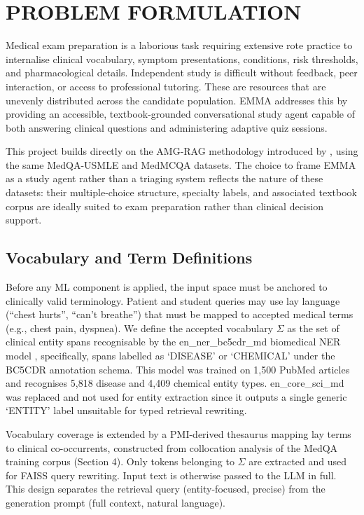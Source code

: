 \section{PROBLEM FORMULATION}
Medical exam preparation is a laborious task requiring extensive rote practice to internalise clinical vocabulary, symptom presentations, conditions, risk thresholds, and pharmacological details. Independent study is difficult without feedback, peer interaction, or access to professional tutoring. These are resources that are unevenly distributed across the candidate population. EMMA addresses this by providing an accessible, textbook-grounded conversational study agent capable of both answering clinical questions and administering adaptive quiz sessions.

This project builds directly on the AMG-RAG methodology introduced by \cite{rezaei2025}, using the same MedQA-USMLE and MedMCQA datasets. The choice to frame EMMA as a study agent rather than a triaging system reflects the nature of these datasets: their multiple-choice structure, specialty labels, and associated textbook corpus are ideally suited to exam preparation rather than clinical decision support.

\subsection{Vocabulary and Term Definitions}
Before any ML component is applied, the input space must be anchored to clinically valid terminology. Patient and student queries may use lay language (``chest hurts'', ``can't breathe'') that must be mapped to accepted medical terms (e.g., chest pain, dyspnea). We define the accepted vocabulary $\Sigma$ as the set of clinical entity spans recognisable by the en\_ner\_bc5cdr\_md biomedical NER model \cite{neumann2019}, specifically, spans labelled as `DISEASE' or `CHEMICAL' under the BC5CDR annotation schema. This model was trained on 1,500 PubMed articles and recognises 5,818 disease and 4,409 chemical entity types. en\_core\_sci\_md was replaced and not used for entity extraction since it outputs a single generic `ENTITY' label unsuitable for typed retrieval rewriting.

Vocabulary coverage is extended by a PMI-derived thesaurus mapping lay terms to clinical co-occurrents, constructed from collocation analysis of the MedQA training corpus (Section 4). Only tokens belonging to $\Sigma$ are extracted and used for FAISS query rewriting. Input text is otherwise passed to the LLM in full. This design separates the retrieval query (entity-focused, precise) from the generation prompt (full context, natural language).

